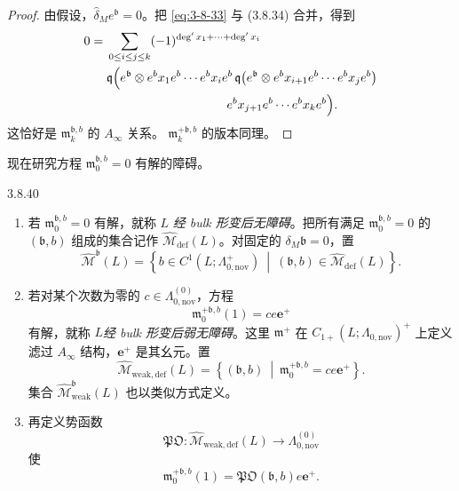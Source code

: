 \begin{proof}
由假设，$\widehat\delta_Me^{\mathfrak b}=0$。把
\eqref{eq:3-8-33} 与 (3.8.34) 合并，得到
\[
\begin{aligned}
0={}&
\sum_{0\leq i\leq j\leq k}
(-1)^{\deg' x_1+\cdots+\deg' x_i}\\
&\mathfrak q\Bigl(
 e^{\mathfrak b}\otimes
 e^b x_1e^b\cdots e^b x_ie^b\,
 \mathfrak q\bigl(
  e^{\mathfrak b}\otimes
  e^b x_{i+1}e^b\cdots e^b x_je^b
 \bigr)\\
&\hspace{34mm}{}
 e^b x_{j+1}e^b\cdots e^b x_ke^b
\Bigr).
\end{aligned}
\]
这恰好是 $\mathfrak m_k^{\mathfrak b,b}$ 的 $A_\infty$ 关系。
$\mathfrak m_k^{+\mathfrak b,b}$ 的版本同理。
\end{proof}

现在研究方程 $\mathfrak m_0^{\mathfrak b,b}=0$ 有解的障碍。

\begin{definition}{3.8.40}\label{def:3-8-40}
\begin{enumerate}[label=\textup{(\arabic*)},leftmargin=2.8em]
\item 若 $\mathfrak m_0^{\mathfrak b,b}=0$ 有解，就称 $L$
\emph{经 bulk 形变后无障碍}。把所有满足
$\mathfrak m_0^{\mathfrak b,b}=0$ 的 $(\mathfrak b,b)$ 组成的集合记作
$\widehat{\mathcal M}_{\mathrm{def}}(L)$。对固定的
$\delta_M\mathfrak b=0$，置
\[
 \widehat{\mathcal M}^{\mathfrak b}(L)
 =
 \left\{
 b\in C^1(L;\Lambda^+_{0,\mathrm{nov}})
 \ \middle|\
 (\mathfrak b,b)\in
 \widehat{\mathcal M}_{\mathrm{def}}(L)
 \right\}.
\]

\item 若对某个次数为零的
$c\in\Lambda^{(0)}_{0,\mathrm{nov}}$，方程
\[
 \mathfrak m_0^{+\mathfrak b,b}(1)
 =ce\mathbf e^+
\]
有解，就称 $L$\emph{经 bulk 形变后弱无障碍}。这里
$\mathfrak m^+$ 在 $C_{1+}(L;\Lambda_{0,\mathrm{nov}})^+$ 上定义滤过
$A_\infty$ 结构，$\mathbf e^+$ 是其幺元。置
\[
 \widehat{\mathcal M}_{\mathrm{weak,def}}(L)
 =
 \left\{
 (\mathfrak b,b)
 \ \middle|\
 \mathfrak m_0^{+\mathfrak b,b}=ce\mathbf e^+
 \right\}.
\]
集合 $\widehat{\mathcal M}^{\mathfrak b}_{\mathrm{weak}}(L)$
也以类似方式定义。

\item 再定义势函数
\[
 \mathfrak{PO}\colon
 \widehat{\mathcal M}_{\mathrm{weak,def}}(L)
 \longrightarrow\Lambda^{(0)}_{0,\mathrm{nov}}
\]
使
\[
 \mathfrak m_0^{+\mathfrak b,b}(1)
 =
 \mathfrak{PO}(\mathfrak b,b)e\mathbf e^+.
\]
\end{enumerate}
\end{definition}

